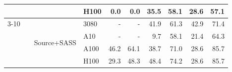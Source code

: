 \begin{tabular}{@{}llllrrrrrr@{}}
 &  &  & H100 & \cellcolor[rgb]{1.000,1.000,1.000}0.0 & \cellcolor[rgb]{1.000,1.000,1.000}0.0 & \cellcolor[rgb]{1.000,0.809,0.809}35.5 & \cellcolor[rgb]{1.000,0.581,0.581}58.1 & \cellcolor[rgb]{1.000,0.865,0.865}28.6 & \cellcolor[rgb]{1.000,0.592,0.592}57.1 \\
\cmidrule(lr){3-10}
 &  & \multirow{4}{*}{Source+SASS} & 3080 & \cellcolor[rgb]{1.000,1.000,1.000}- & \cellcolor[rgb]{1.000,1.000,1.000}- & \cellcolor[rgb]{1.000,0.751,0.751}41.9 & \cellcolor[rgb]{1.000,0.543,0.543}61.3 & \cellcolor[rgb]{1.000,0.742,0.742}42.9 & \cellcolor[rgb]{1.000,0.417,0.417}71.4 \\
 &  &  & A10 & \cellcolor[rgb]{1.000,1.000,1.000}- & \cellcolor[rgb]{1.000,1.000,1.000}- & \cellcolor[rgb]{1.000,0.976,0.976}9.7 & \cellcolor[rgb]{1.000,0.581,0.581}58.1 & \cellcolor[rgb]{1.000,0.915,0.915}21.4 & \cellcolor[rgb]{1.000,0.507,0.507}64.3 \\
 &  &  & A100 & \cellcolor[rgb]{1.000,0.709,0.709}46.2 & \cellcolor[rgb]{1.000,0.509,0.509}64.1 & \cellcolor[rgb]{1.000,0.781,0.781}38.7 & \cellcolor[rgb]{1.000,0.422,0.422}71.0 & \cellcolor[rgb]{1.000,0.865,0.865}28.6 & \cellcolor[rgb]{1.000,0.219,0.219}85.7 \\
 &  &  & H100 & \cellcolor[rgb]{1.000,0.860,0.860}29.3 & \cellcolor[rgb]{1.000,0.688,0.688}48.3 & \cellcolor[rgb]{1.000,0.687,0.687}48.4 & \cellcolor[rgb]{1.000,0.380,0.380}74.2 & \cellcolor[rgb]{1.000,0.865,0.865}28.6 & \cellcolor[rgb]{1.000,0.219,0.219}85.7 \\
\bottomrule
\end{tabular}
\endgroup
